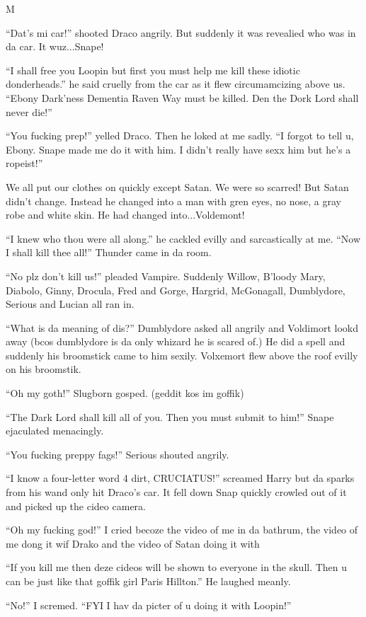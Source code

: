 M\documentclass{article}
\begin{document}
\textbreak
\linenumbers\resetlinenumber

“Dat’s mi car!” shooted Draco angrily. But suddenly it was revealied who was in da car. It wuz...Snape!

“I shall free you Loopin but first you must help me kill these idiotic donderheads.” he said cruelly from the car as it flew circumamcizing above us. “Ebony Dark’ness Dementia Raven Way must be killed. Den the Dork Lord shall never die!”

“You fucking prep!” yelled Draco. Then he loked at me sadly. “I forgot to tell u, Ebony. Snape made me do it with him. I didn’t really have sexx him but he’s a ropeist!”

We all put our clothes on quickly except Satan. We were so scarred! But Satan didn’t change. Instead he changed into a man with gren eyes, no nose, a gray robe and white skin. He had changed into...Voldemont!

“I knew who thou were all along.” he cackled evilly and sarcastically at me. “Now I shall kill thee all!” Thunder came in da room.

“No plz don’t kill us!” pleaded Vampire. Suddenly Willow, B’loody Mary, Diabolo, Ginny, Drocula, Fred and Gorge, Hargrid, McGonagall, Dumblydore, Serious and Lucian all ran in.

“What is da meaning of dis?” Dumblydore asked all angrily and Voldimort lookd away (bcos dumblydore is da only whizard he is scared of.) He did a spell and suddenly his broomstick came to him sexily. Volxemort flew above the roof evilly on his broomstik.

“Oh my goth!” Slugborn gosped. (geddit kos im goffik)

“The Dark Lord shall kill all of you. Then you must submit to him!” Snape ejaculated menacingly.

“You fucking preppy fags!” Serious shouted angrily.

“I know a four-letter word 4 dirt, CRUCIATUS!” screamed Harry but da sparks from his wand only hit Draco’s car. It fell down Snap quickly crowled out of it and picked up the cideo camera.

“Oh my fucking god!” I cried becoze the video of me in da bathrum, the video of me dong it wif Drako and the video of Satan doing it with

“If you kill me then deze cideos will be shown to everyone in the skull. Then u can be just like that goffik girl Paris Hillton.” He laughed meanly.

“No!” I scremed. “FYI I hav da picter of u doing it with Loopin!”
\end{document}
